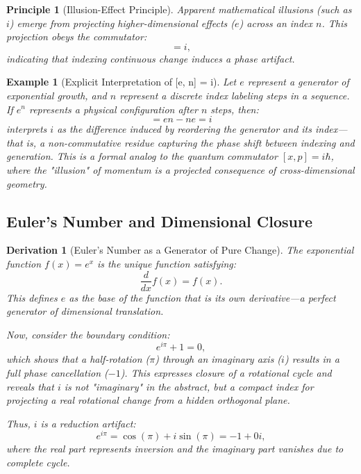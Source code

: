\documentclass{article}
\newtheorem{principle}{Principle}
\newtheorem{derivation}{Derivation}
\newtheorem{example}{Example}
\begin{document}
\begin{principle}[Illusion-Effect Principle]
Apparent mathematical illusions (such as \( i \)) emerge from projecting higher-dimensional effects (\( e \)) across an index \( n \). This projection obeys the commutator:
\begin{equation}
[e, n] = i,
\end{equation}
indicating that indexing continuous change induces a phase artifact.
\end{principle}

\begin{example}[Explicit Interpretation of {[}e, n{]} = i]
Let \( e \) represent a generator of exponential growth, and \( n \) represent a discrete index labeling steps in a sequence. If \( e^n \) represents a physical configuration after \( n \) steps, then:
\begin{equation}
[e, n] = en - ne = i
\end{equation}
interprets \( i \) as the difference induced by reordering the generator and its index---that is, a non-commutative residue capturing the phase shift between indexing and generation. This is a formal analog to the quantum commutator \( [x, p] = i\hbar \), where the "illusion" of momentum is a projected consequence of cross-dimensional geometry.
\end{example}



\subsection*{Euler's Number and Dimensional Closure}

\begin{derivation}[Euler's Number as a Generator of Pure Change]
The exponential function \( f(x) = e^x \) is the unique function satisfying:
\begin{equation}
\frac{d}{dx}f(x) = f(x).
\end{equation}
This defines \( e \) as the base of the function that is its own derivative---a perfect generator of dimensional translation.

Now, consider the boundary condition:
\begin{equation}
e^{i\pi} + 1 = 0,
\end{equation}
which shows that a half-rotation (\( \pi \)) through an imaginary axis (\( i \)) results in a full phase cancellation (\( -1 \)). This expresses closure of a rotational cycle and reveals that \( i \) is not "imaginary" in the abstract, but a compact index for projecting a real rotational change from a hidden orthogonal plane.

Thus, \( i \) is a reduction artifact:
\begin{equation}
e^{i\pi} = \cos(\pi) + i\sin(\pi) = -1 + 0i,
\end{equation}
where the real part represents inversion and the imaginary part vanishes due to complete cycle.
\end{derivation}
\end{document}
